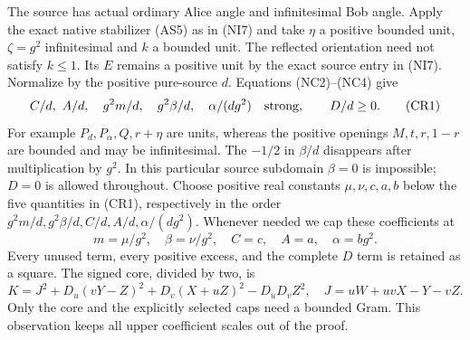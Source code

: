 \label{p013c226a79b3:sec:c1-ui-remote}
The source has actual ordinary Alice angle and infinitesimal Bob
angle. Apply the exact native stabilizer (AS5) as in (NI7) and take
$\eta$ a positive bounded unit, $\zeta=g^2$ infinitesimal and $k$ a
bounded unit. The reflected orientation need not satisfy $k\le1$.
Its $E$ remains a positive unit by the exact source entry in (NI7).
Normalize by the positive pure-source $d$.
Equations (NC2)--(NC4) give
\[
 C/d,\ A/d,\quad g^2m/d,\quad g^2\beta/d,\quad
 \alpha/(dg^2)\quad\hbox{strong},\qquad D/d\ge0.       \tag{CR1}
\]
For example $P_d,P_\alpha,Q,r+\eta$ are units, whereas the
positive openings $M,t,r,1-r$ are bounded and may be infinitesimal.
The $-1/2$ in $\beta/d$ disappears after multiplication by $g^2$.
In this particular source subdomain $\beta=0$ is impossible; $D=0$
is allowed throughout. Choose positive real constants
$\mu,\nu,c,a,b$ below the five quantities in (CR1), respectively
in the order $g^2m/d,g^2\beta/d,C/d,A/d,\alpha/(dg^2)$.
Whenever needed we cap these coefficients at
\[
 m=\mu/g^2,\quad\beta=\nu/g^2,\quad C=c,\quad A=a,
 \quad\alpha=bg^2.                                  \tag{CR2}
\]
Every unused term, every positive excess, and the complete $D$
term is retained as a square. The signed core, divided by two, is
\[
 K=J^2+D_u(vY-Z)^2+D_v(X+uZ)^2-D_uD_vZ^2,
 \quad J=uW+uvX-Y-vZ.                              \tag{CR3}
\]
Only the core and the explicitly selected caps need a bounded Gram.
This observation keeps all upper coefficient scales out of the proof.

